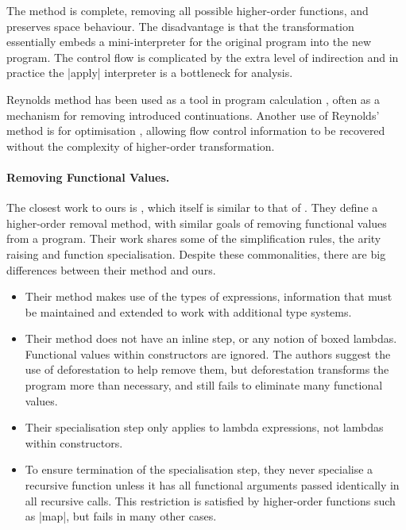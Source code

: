 The method is complete, removing all possible higher-order functions, and preserves space behaviour. The disadvantage is that the transformation essentially embeds a mini-interpreter for the original program into the new program. The control flow is complicated by the extra level of indirection and in practice the |apply| interpreter is a bottleneck for analysis.

Reynolds method has been used as a tool in program calculation \cite{danvy:defunctionalization_at_work,hutton:calculating_an_exceptional_machine}, often as a mechanism for removing introduced continuations. Another use of Reynolds' method is for optimisation \cite{grin,jhc}, allowing flow control information to be recovered without the complexity of higher-order transformation.

\paragraph{Removing Functional Values.} The closest work to ours is \citet{chin:higher_order_removal}, which itself is similar to that of \citet{nelan:firstification}. They define a higher-order removal method, with similar goals of removing functional values from a program. Their work shares some of the simplification rules, the arity raising and function specialisation. Despite these commonalities, there are big differences between their method and ours.

\begin{itemize}
\item Their method makes use of the types of expressions, information that must be maintained and extended to work with additional type systems.
\item Their method does not have an inline step, or any notion of boxed lambdas. Functional values within constructors are ignored. The authors suggest the use of deforestation \cite{wadler:deforestation} to help remove them, but deforestation transforms the program more than necessary, and still fails to eliminate many functional values.
\item Their specialisation step only applies to lambda expressions, not lambdas within constructors.
\item To ensure termination of the specialisation step, they never specialise a recursive function unless it has all functional arguments passed identically in all recursive calls. This restriction is satisfied by higher-order functions such as |map|, but fails in many other cases.
\end{itemize}

